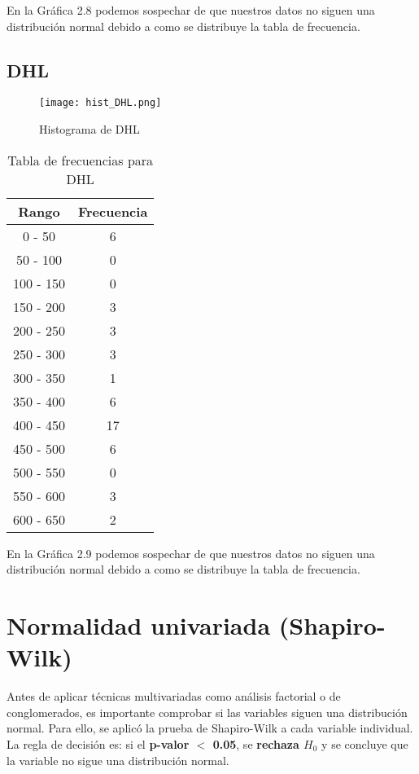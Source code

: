 \documentclass[12pt]{report}
\begin{document}
\noindent En la Gráfica 2.8 podemos sospechar de que nuestros datos no siguen una distribución normal debido a como se distribuye la tabla de frecuencia. 

\subsection{DHL}
\begin{figure}[H]
    \centering
    \texttt{[image: hist\_DHL.png]}
    \caption{Histograma de DHL}
\end{figure}

\begin{table}[H]
    \centering
    \begin{tabular}{|c|c|}
        \hline
        \textbf{Rango} & \textbf{Frecuencia} \\
        \hline
        0 - 50 & 6 \\
        50 - 100 & 0 \\
        100 - 150 & 0 \\
        150 - 200 & 3 \\
        200 - 250 & 3 \\
        250 - 300 & 3 \\
        300 - 350 & 1 \\
        350 - 400 & 6 \\
        400 - 450 & 17 \\
        450 - 500 & 6 \\
        500 - 550 & 0 \\
        550 - 600 & 3 \\
        600 - 650 & 2 \\
        \hline
    \end{tabular}
    \caption{Tabla de frecuencias para DHL}
\end{table}
\noindent En la Gráfica 2.9 podemos sospechar de que nuestros datos no siguen una distribución normal debido a como se distribuye la tabla de frecuencia. 


\newpage

\section{Normalidad univariada (Shapiro-Wilk)}
Antes de aplicar técnicas multivariadas como análisis factorial o de conglomerados, es importante comprobar si las variables siguen una distribución normal. Para ello, se aplicó la prueba de Shapiro-Wilk a cada variable individual.\newline
La regla de decisión es: si el \textbf{p-valor $<$ 0.05}, se \textbf{rechaza $H_0$} y se concluye que la variable no sigue una distribución normal.
\end{document}

